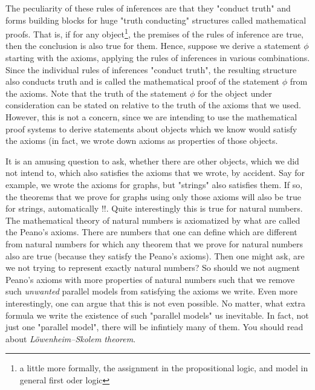 The peculiarity of these rules of inferences are that they "conduct truth"  and forms building blocks for huge "truth conducting" structures called mathematical proofs. That is, if for any object\footnote{a little more formally, the assignment in the propositional logic, and model in general first oder logic}, the premises of the rules of inference are true, then the conclusion is also true for them.   Hence, suppose we derive a statement $\phi$ starting with the axioms, applying the rules of inferences in various combinations. Since the individual rules of inferences "conduct truth", the resulting structure also conducts truth and is called the mathematical proof of the statement $\phi$ from the axioms. Note that the truth of the statement $\phi$ for the object under consideration can be stated on relative to the truth of the axioms that we used. However, this is not a concern, since we are intending to use the mathematical proof systems to derive statements about objects which we know would satisfy the axioms (in fact, we wrote down axioms as properties of those objects.
\begin{curiosity}
It is an amusing question to ask, whether there are other objects, which we did not intend to, which also satisfies the axioms that we wrote, by accident. Say for example, we wrote the axioms for graphs, but "strings" also satisfies them. If so, the theorems that we prove for graphs using only those axioms will also be true for strings, automatically !!. Quite interestingly this is true for natural numbers. The mathematical theory of natural numbers is axiomatized by what are called the Peano's axioms. There are numbers that one can define which are different from natural numbers for which any theorem that we prove for natural numbers also are true (because they satisfy the Peano's axioms). Then one might ask, are we not trying to represent exactly natural numbers? So should we not augment Peano's axioms with more properties of natural numbers such that we remove such {\em unwanted} parallel models from satisfying the axioms we write. Even more interestingly, one can argue that this is not even possible. No matter, what extra formula we write the existence of such "parallel models" us inevitable. In fact, not just one "parallel model", there will be infintiely many of them. You should read about {\em L\"owenheim–Skolem theorem}.
\end{curiosity}

